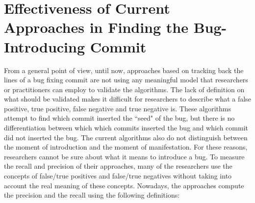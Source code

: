 \documentclass[a4paper, 12pt]{book}
\begin{document}

\section{Effectiveness of Current Approaches in Finding the Bug-Introducing Commit}
 
From a general point of view, until now, approaches based on tracking back the lines of a bug fixing commit are not using any meaningful model that researchers or practitioners can employ to validate the algorithms. The lack of definition on what should be validated makes it difficult for researchers to describe what a false positive, true positive, false negative and true negative is. These algorithms attempt to find which commit inserted the ``seed" of the bug, but there is no differentiation between which which commits inserted the bug and which commit did not inserted the bug. The current algorithms also do not distinguish between the moment of introduction and the moment of manifestation. For these reasons, researchers cannot be sure about what it means to introduce a bug. To measure the recall and precision of their approaches, many of the researchers use the concepts of false/true positives and false/true negatives without taking into account the real meaning of these concepts. Nowadays, the approaches compute the precision and the recall using the following definitions:
\end{document}
